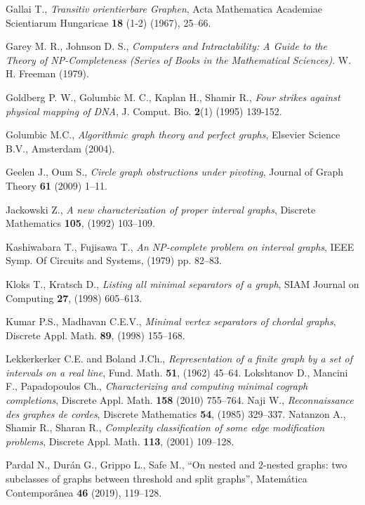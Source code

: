 \documentclass[12pt]{book}
\theoremstyle{plain}
\theoremstyle{remark}
\begin{document}
\begin{thebibliography}{Weibel}

 Gallai T., \emph{Transitiv orientierbare Graphen}, Acta Mathematica Academiae Scientiarum Hungaricae \textbf{18} (1-2) (1967), 25--66.

 Garey M. R., Johnson D. S., \emph{Computers and Intractability: A Guide to the Theory of NP-Completeness (Series of Books in the Mathematical Sciences)}. W. H. Freeman (1979).

 Goldberg P. W., Golumbic M. C., Kaplan H., Shamir R., \emph{Four strikes against physical mapping of DNA}, J. Comput. Bio. \textbf{2}(1) (1995) 139-152.

 Golumbic M.C., \emph{Algorithmic graph theory and perfect graphs}, Elsevier Science B.V., Amsterdam (2004). 

 Geelen J., Oum S., \emph{Circle graph obstructions under pivoting}, Journal of Graph Theory \textbf{61} (2009) 1--11. 



 Jackowski Z., \emph{A new characterization of proper interval graphs}, Discrete Mathematics \textbf{105}, (1992) 103--109.

 Kashiwabara T., Fujisawa T., \emph{An NP-complete problem on interval graphs}, IEEE Symp. Of Circuits and Systems, (1979) pp. 82--83.

 Kloks T., Kratsch D., \emph{Listing all minimal separators of a graph}, SIAM Journal on Computing \textbf{27}, (1998) 605--613.

 Kumar P.S., Madhavan C.E.V., \emph{Minimal vertex separators of chordal graphs}, Discrete Appl. Math. \textbf{89}, (1998) 155--168.


 Lekkerkerker C.E. and Boland J.Ch., \emph{Representation of a finite graph by a set of intervals on a real line}, Fund. Math. \textbf{51}, (1962) 45--64.
 Lokshtanov D., Mancini F., Papadopoulos Ch., \emph{Characterizing and computing minimal cograph completions}, Discrete Appl. Math. \textbf{158} (2010) 755--764.
 Naji W., \emph{Reconnaissance des graphes de cordes}, Discrete Mathematics \textbf{54}, (1985) 329--337.
 Natanzon A., Shamir R., Sharan R., \emph{Complexity classification of some edge modification problems}, Discrete Appl. Math. \textbf{113}, (2001) 109--128.
      
 Pardal N., Dur\'an G., Grippo L., Safe M., ``On nested and $2$-nested graphs: two subclasses of graphs between threshold and split graphs'', Matem\'atica Contempor\^anea \textbf{46} (2019), 119--128.


\end{thebibliography}
\end{document}
